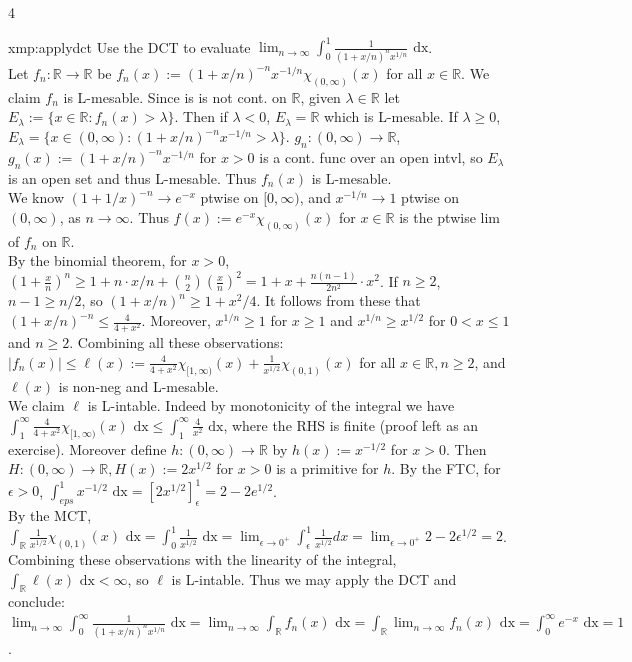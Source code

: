 \documentclass[landscape, 8pt]{extarticle}
\begin{document}
\begin{multicols*}{4}
		
		\begin{xmp}{xmp:applydct}{ }
		Use the DCT to evaluate $\lim_{n\to \infty} \int_{0}^{1}\frac{1}{(1+x/n)^n x^{1/n}} \text{ dx}$.\\
		Let $f_n: \mathbb{R} \to \mathbb{R}$ be $f_n(x) := (1+x/n)^{-n} x^{-1/n} \chi_{(0, \infty)}(x)$ for all $x\in \mathbb{R}$. We claim $f_n$ is L-mesable. Since is is not cont. on $\mathbb{R}$, given $\lambda\in \mathbb{R}$ let $E_\lambda := \{x\in \mathbb{R} : f_n(x) > \lambda\}$. Then if $\lambda < 0$, $E_\lambda = \mathbb{R}$ which is L-mesable. If $\lambda \ge 0$, $E_\lambda = \{x\in (0, \infty) : (1+ x/n)^{-n}x^{-1/n} > \lambda\}$. $g_n : (0, \infty) \to \mathbb{R}$, $g_n(x) := (1+ x/n)^{-n}x^{-1/n}$ for $x > 0$ is a cont. func over an open intvl, so $E_\lambda$ is an open set and thus L-mesable. Thus $f_n(x)$ is L-mesable.\\
		We know $(1 + 1/x)^{-n} \to e^{-x}$ ptwise on $[0, \infty)$, and $x^{-1/n} \to 1$ ptwise on $(0, \infty)$, as $n \to \infty$. Thus $f(x) := e^{-x} \chi_{(0, \infty)}(x)$ for $x\in \mathbb{R}$ is the ptwise lim of $f_n$ on $\mathbb{R}$.\\
		By the binomial theorem, for $x > 0$, $(1 + \frac{x}{n})^n \ge 1 + n \cdot x/n + \binom{n}{2} \left(\frac{x}{n}\right)^2 = 1 + x + \frac{n(n-1)}{2n^2} \cdot x^2$. If $n \ge 2$, $ n-1 \ge n/2$, so $(1 + x/n)^n \ge 1 + x^2/4$. It follows from these that $(1 + x/n)^{-n} \le \frac{4}{4+x^2}$. Moreover, $x^{1/n} \ge 1$ for $x \ge 1$ and $x^{1/n} \ge x^{1/2}$ for $0 < x \le 1$ and $n \ge 2$. Combining all these observations:\\
		$\left|f_n(x)\right| \le \ell(x) := \frac{4}{4 + x^2}\chi_{[1, \infty)}(x) + \frac{1}{x^{1/2}}\chi_{(0,1)}(x)$ for all $x\in \mathbb{R}, n \ge 2$, and $\ell(x)$ is non-neg and L-mesable.\\
		We claim $\ell$ is L-intable. Indeed by monotonicity of the integral we have $\int_{1}^{\infty} \frac{4}{4+x^2} \chi_{[1, \infty)}(x) \text{ dx} \le \int_{1}^{\infty} \frac{4}{x^2} \text{ dx}$, where the RHS is finite (proof left as an exercise). Moreover define $h: (0, \infty) \to \mathbb{R}$ by $h(x) := x^{-1/2}$ for $x > 0$. Then $H: (0, \infty) \to \mathbb{R}, H(x) := 2x^{1/2}$ for $x> 0$ is a primitive for $h$. By the FTC, for $\epsilon > 0$, $\int_{eps}^{1} x^{-1/2} \text{ dx} = \left[2x^{1/2}\right]_\epsilon^1 = 2 - 2e^{1/2}$.\\
		By the MCT, $\int_{\mathbb{R}} \frac{1}{x^{1/2}}\chi_{(0,1)}(x) \text{ dx} = \int_{0}^{1} \frac{1}{x^{1/2}} \text{ dx} = \lim_{\epsilon\to 0^+} \int_{\epsilon}^{1}\frac{1}{x^{1/2}}dx = \lim_{\epsilon\to 0^+} 2 - 2\epsilon^{1/2} = 2$.\\
		Combining these observations with the linearity of the integral, $\int_{\mathbb{R}} \ell(x) \text{ dx} < \infty$, so $\ell$ is L-intable. Thus we may apply the DCT and conclude:\\
		$\lim_{n\to \infty} \int_{0}^{\infty} \frac{1}{(1+x/n)^n x^{1/n}} \text{ dx} = \lim_{n\to \infty} \int_{\mathbb{R}}f_n(x) \text{ dx} = \int_{\mathbb{R}} \lim_{n\to \infty} f_n(x) \text{ dx} = \int_{0}^{\infty} e^{-x} \text{ dx} = 1$.
		

\end{xmp}
\end{multicols*}
\end{document}
